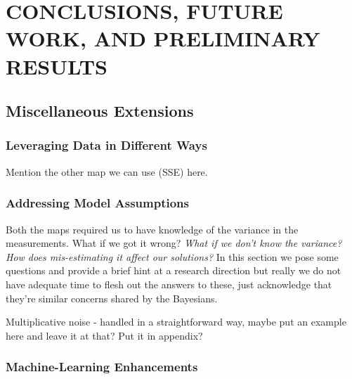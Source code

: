 \chapter{\uppercase{Conclusions, Future Work, and Preliminary Results} \label{chapter:future}}



\FloatBarrier

%
%
%

\section{Miscellaneous Extensions}


\subsection{Leveraging Data in Different Ways}\label{sec:ch05-data}
Mention the other map we can use (SSE) here.

\subsection{Addressing Model Assumptions}\label{sec:ch05-variance}
Both the maps required us to have knowledge of the variance in the measurements.
What if we got it wrong?
\emph{What if we don't know the variance? How does mis-estimating it affect our solutions?}
In this section we pose some questions and provide a brief hint at a research direction but really we do not have adequate time to flesh out the answers to these, just acknowledge that they're similar concerns shared by the Bayesians.

Multiplicative noise - handled in a straightforward way, maybe put an example here and leave it at that? Put it in appendix?


\subsection{Machine-Learning Enhancements}\label{sec:ch05-ml}

